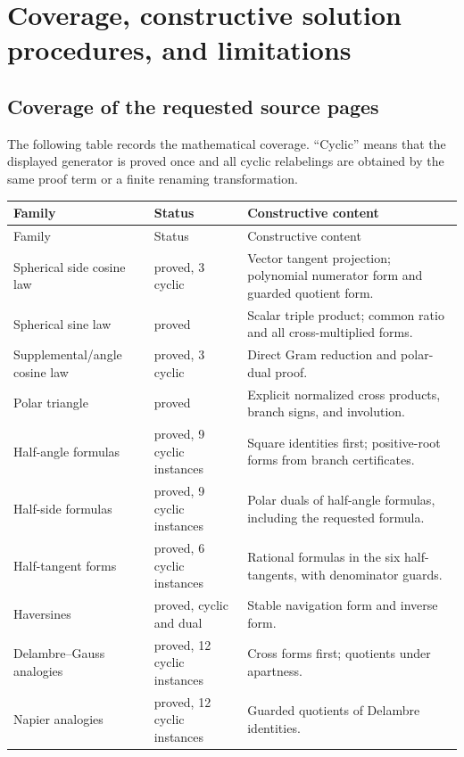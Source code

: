 \section{Coverage, constructive solution procedures, and limitations}
\label{sec:coverage}

\subsection{Coverage of the requested source pages}

The following table records the mathematical coverage.  ``Cyclic'' means that
the displayed generator is proved once and all cyclic relabelings are obtained
by the same proof term or a finite renaming transformation.

\begin{longtable}{@{}p{}p{}p{}@{}}
\toprule
Family & Status & Constructive content \\
\midrule
\endfirsthead
\toprule
Family & Status & Constructive content \\
\midrule
\endhead
Spherical side cosine law & proved, 3 cyclic & Vector tangent projection;
polynomial numerator form and guarded quotient form.\\
Spherical sine law & proved & Scalar triple product; common ratio and all
cross-multiplied forms.\\
Supplemental/angle cosine law & proved, 3 cyclic & Direct Gram reduction and
polar-dual proof.\\
Polar triangle & proved & Explicit normalized cross products, branch signs,
and involution.\\
Half-angle formulas & proved, 9 cyclic instances & Square identities first;
positive-root forms from branch certificates.\\
Half-side formulas & proved, 9 cyclic instances & Polar duals of half-angle
formulas, including the requested formula.\\
Half-tangent forms & proved, 6 cyclic instances & Rational formulas in the six
half-tangents, with denominator guards.\\
Haversines & proved, cyclic and dual & Stable navigation form and inverse
form.\\
Delambre--Gauss analogies & proved, 12 cyclic instances & Cross forms first;
quotients under apartness.\\
Napier analogies & proved, 12 cyclic instances & Guarded quotients of
Delambre identities.\\

\end{longtable}
